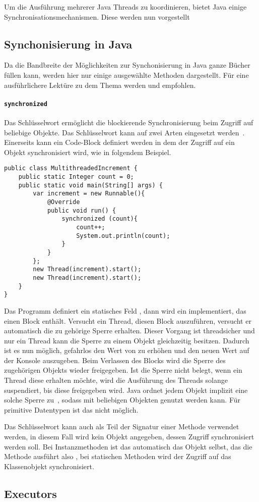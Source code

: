 Um die Ausführung mehrerer Java Threads zu koordinieren, bietet Java einige Synchronisationsmechanismen. Diese werden nun vorgestellt

\subsection{Synchonisierung in Java}
Da die Bandbreite der Möglichkeiten zur Synchonisierung in Java ganze Bücher füllen kann, werden hier nur einige ausgewählte Methoden dargestellt. Für eine ausführlichere Lektüre zu dem Thema werden \cite{Friesen2015} und \cite{Hettel2016} empfohlen.

\paragraph{\texttt{synchronized}} Das Schlüsselwort  ermöglicht die blockierende Synchronisierung beim Zugriff auf beliebige Objekte. Das Schlüsselwort kann auf zwei Arten eingesetzt werden~\Cite[S.~339~ff.]{Rauber2006}. Einerseits kann ein Code-Block definiert werden in dem der Zugriff auf ein Objekt synchronisiert wird, wie in folgendem Beispiel.
\begin{lstlisting}
public class MultithreadedIncrement {
	public static Integer count = 0;
	public static void main(String[] args) {
		var increment = new Runnable(){
			@Override
			public void run() {
				synchronized (count){
					count++;
					System.out.println(count);
				}
			}
		};
		new Thread(increment).start();
		new Thread(increment).start();
	}
}	
\end{lstlisting}
Das Programm definiert ein statisches Feld , dann wird ein  implementiert, das einen  Block enthält. Versucht ein Thread, diesen Block auszuführen, versucht er automatisch die zu  gehörige Sperre erhalten. Dieser Vorgang ist threadsicher und nur ein Thread kann die Sperre zu einem Objekt gleichzeitig besitzen. Dadurch ist es nun möglich, gefahrlos den Wert von  zu erhöhen und den neuen Wert auf der Konsole auszugeben. Beim Verlassen des  Blocks wird die Sperre des zugehörigen Objekts wieder freigegeben. Ist die Sperre nicht belegt, wenn ein Thread diese erhalten möchte, wird die Ausführung des Threads solange suspendiert, bis diese freigegeben wird. Java ordnet jedem Objekt implizit eine solche Sperre zu~\cite{Friesen2015}, sodass  mit beliebigen Objekten genutzt werden kann. Für primitive Datentypen ist das nicht möglich.

Das Schlüsselwort  kann auch als Teil der Signatur einer Methode verwendet werden, in diesem Fall wird kein Objekt angegeben, dessen Zugriff synchronisiert werden soll. Bei Instanzmethoden ist das automatisch das Objekt selbst, das die Methode ausführt also , bei statischen Methoden wird der Zugriff auf das Klassenobjekt synchronisiert.

\subsection{Executors}\label{sec:executor}